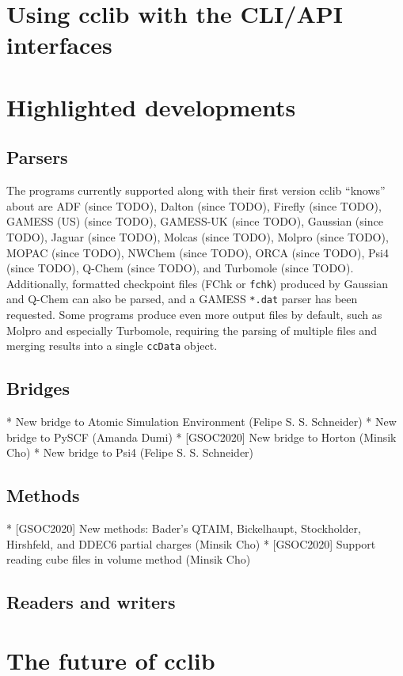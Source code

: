 \documentclass[num-refs]{wiley-article}
\begin{document}
\section{Using cclib with the CLI/API interfaces}

\section{Highlighted developments}
\subsection{Parsers}

The programs currently supported along with their first version cclib ``knows'' about are ADF (since TODO), Dalton (since TODO), Firefly (since TODO), GAMESS (US) (since TODO), GAMESS-UK (since TODO), Gaussian (since TODO), Jaguar (since TODO), Molcas (since TODO), Molpro (since TODO), MOPAC (since TODO), NWChem (since TODO), ORCA (since TODO), Psi4 (since TODO), Q-Chem (since TODO), and Turbomole (since TODO).  Additionally, formatted checkpoint files (FChk or \texttt{fchk}) produced by Gaussian and Q-Chem can also be parsed, and a GAMESS \texttt{*.dat} parser has been requested.  Some programs produce even more output files by default, such as Molpro and especially Turbomole, requiring the parsing of multiple files and merging results into a single \texttt{ccData} object.

\subsection{Bridges}
    * New bridge to Atomic Simulation Environment (Felipe S. S. Schneider)
    * New bridge to PySCF (Amanda Dumi)
    * [GSOC2020] New bridge to Horton (Minsik Cho)
    * New bridge to Psi4 (Felipe S. S. Schneider)
\subsection{Methods}

    * [GSOC2020] New methods: Bader's QTAIM, Bickelhaupt, Stockholder, Hirshfeld, and DDEC6 partial charges (Minsik Cho)
    * [GSOC2020] Support reading cube files in volume method (Minsik Cho)

\subsection{Readers and writers}


\section{The future of cclib}
\end{document}
